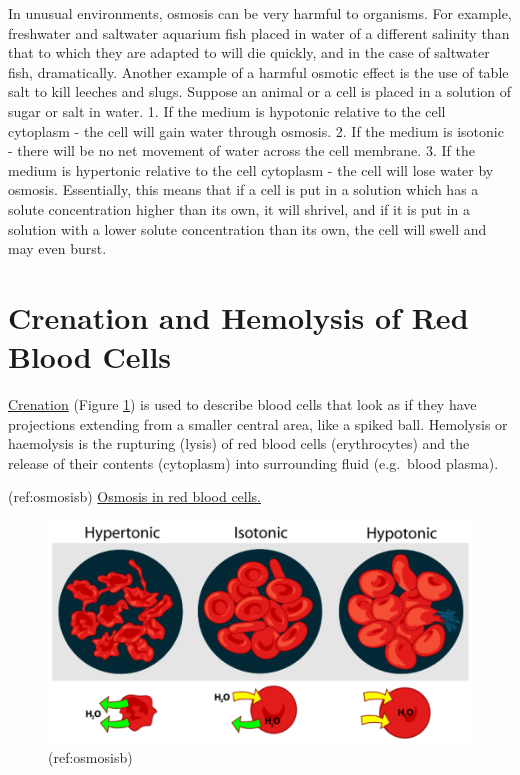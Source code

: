 In unusual environments, osmosis can be very harmful to organisms. For
example, freshwater and saltwater aquarium fish placed in water of a
different salinity than that to which they are adapted to will die
quickly, and in the case of saltwater fish, dramatically. Another
example of a harmful osmotic effect is the use of table salt to kill
leeches and slugs. Suppose an animal or a cell is placed in a solution
of sugar or salt in water. 1. If the medium is hypotonic relative to the
cell cytoplasm - the cell will gain water through osmosis. 2. If the
medium is isotonic - there will be no net movement of water across the
cell membrane. 3. If the medium is hypertonic relative to the cell
cytoplasm - the cell will lose water by osmosis. Essentially, this means
that if a cell is put in a solution which has a solute concentration
higher than its own, it will shrivel, and if it is put in a solution
with a lower solute concentration than its own, the cell will swell and
may even burst.

\section{Crenation and Hemolysis of Red Blood
Cells}\label{crenation-and-hemolysis-of-red-blood-cells}

\href{https://en.wikipedia.org/wiki/Crenation}{Crenation} (Figure
\ref{fig:osmosisb}) is used to describe blood cells that look as if they
have projections extending from a smaller central area, like a spiked
ball. Hemolysis or haemolysis is the rupturing (lysis) of red blood
cells (erythrocytes) and the release of their contents (cytoplasm) into
surrounding fluid (e.g.~blood plasma).

(ref:osmosisb)
\href{https://commons.wikimedia.org/wiki/File:Osmotic_pressure_on_blood_cells_diagram.svg}{Osmosis
in red blood cells.}

\begin{figure}

{\centering \includegraphics[width=0.7\linewidth]{./figures/exchange/Osmosis_blood} 

}

\caption{(ref:osmosisb)}\label{fig:osmosisb}
\end{figure}

